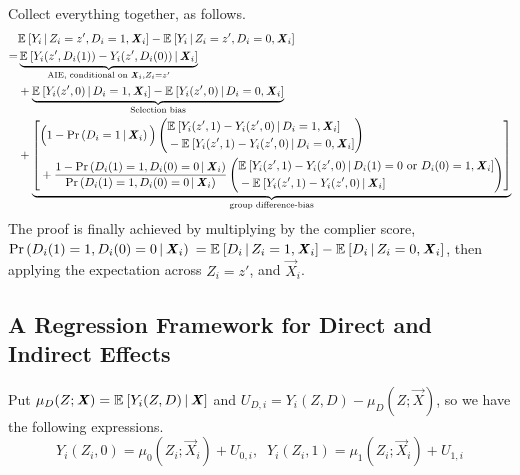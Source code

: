 Collect everything together, as follows.
\begin{align*}
    &  \mathbb{E}_{} \left[ Y_i \, \middle\vert \, Z_i = z', D_i = 1, \boldsymbol{\mathit{X}}_i \right]
    - \mathbb{E}_{} \left[ Y_i \, \middle\vert \, Z_i = z', D_i = 0, \boldsymbol{\mathit{X}}_i \right] \\
    =& \underbrace{
        \mathbb{E}_{} \left[ Y_i(z', D_i(1)) - Y_i(z', D_i(0)) \, \middle\vert \, \boldsymbol{\mathit{X}}_i \right]}_{
            \text{AIE, conditional on }\boldsymbol{\mathit{X}}_i, Z_i = z'} \\
    &+ \underbrace{
        \mathbb{E}_{} \left[ Y_i(z', 0) \, \middle\vert \, D_i = 1, \boldsymbol{\mathit{X}}_i \right]
            - \mathbb{E}_{} \left[ Y_i(z', 0) \, \middle\vert \, D_i = 0, \boldsymbol{\mathit{X}}_i \right]}_{
                \text{Selection bias}} \\
    &+ \underbrace{\left[ \begin{aligned}
        &\Big(1 - \Pr\left( D_i = 1 \, \middle\vert \, \boldsymbol{\mathit{X}}_i \right) \Big)
        \left( \begin{aligned}
            &\mathbb{E}_{} \left[ Y_i(z', 1) - Y_i(z', 0) \, \middle\vert \, D_i = 1, \boldsymbol{\mathit{X}}_i \right] \\ 
            &  - \mathbb{E}_{} \left[ Y_i(z', 1) - Y_i(z', 0) \, \middle\vert \, D_i = 0, \boldsymbol{\mathit{X}}_i \right]
        \end{aligned} \right) \\
        &+ \frac{1 - \Pr\left( D_i(1) = 1, D_i(0) = 0 \, \middle\vert \, \boldsymbol{\mathit{X}}_i \right) }{
            \Pr\left( D_i(1) = 1, D_i(0) = 0 \, \middle\vert \, \boldsymbol{\mathit{X}}_i \right)} 
        \left( \begin{aligned}
            &\mathbb{E}_{} \left[ Y_i(z', 1) - Y_i(z', 0) \, \middle\vert \, D_i(1) = 0 \text{ or } D_i(0)=1, \boldsymbol{\mathit{X}}_i \right] \\ 
            &  - \mathbb{E}_{} \left[ Y_i(z', 1) - Y_i(z', 0) \, \middle\vert \, \boldsymbol{\mathit{X}}_i \right]
        \end{aligned} \right)
    \end{aligned} \right] }_{
        \text{group difference-bias}}
\end{align*}
The proof is finally achieved by multiplying by the complier score, 
$\Pr\left( D_i(1) = 1, D_i(0) = 0 \, \middle\vert \, \boldsymbol{\mathit{X}}_i \right)$
$= \mathbb{E}_{} \left[ D_i \, \middle\vert \, Z_i = 1, \boldsymbol{\mathit{X}}_i \right] - \mathbb{E}_{} \left[ D_i \, \middle\vert \, Z_i = 0, \boldsymbol{\mathit{X}}_i \right]$,
then applying the expectation across $Z_i = z'$, and $\vec X_i$.

\subsection{A Regression Framework for Direct and Indirect Effects}
\label{appendix:regression-model}
Put $\mu_{D}(Z; \boldsymbol{\mathit{X}}) = \mathbb{E}_{} \left[ Y_i(Z, D) \, \middle\vert \, \boldsymbol{\mathit{X}} \right]$ and $U_{D, i} = Y_i(Z,D) - \mu_D(Z; \vec X)$, so we have the following expressions.
\[ Y_i(Z_i, 0)
        = \mu_{0}(Z_i; \vec X_i) + U_{0,i}, \;\;
    Y_i(Z_i, 1)
        = \mu_{1}(Z_i; \vec X_i) + U_{1,i} \]

